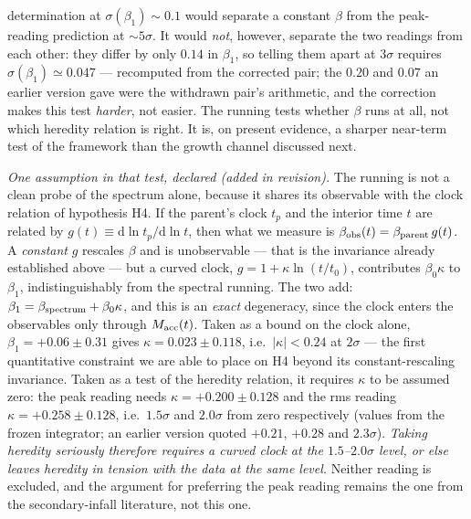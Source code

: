 \documentclass[11pt]{article}
\begin{document}
determination at $\sigma(\beta_1) \sim 0.1$ would separate a constant $\beta$ from the
peak-reading prediction at $\sim 5\sigma$. It would \emph{not}, however, separate the two readings
from each other: they differ by only $0.14$ in $\beta_1$, so telling them apart at $3\sigma$
requires $\sigma(\beta_1) \simeq 0.047$ --- recomputed from the corrected pair; the $0.20$ and $0.07$ an earlier version gave were the withdrawn pair's arithmetic, and the correction makes this test \emph{harder}, not easier. The running tests whether $\beta$ runs at all, not which
heredity relation is right. It is, on present evidence, a sharper near-term test of
the framework than the growth channel discussed next.

\emph{One assumption in that test, declared (added in revision).} The running is not a clean
probe of the spectrum alone, because it shares its observable with the clock relation of
hypothesis H4. If the parent's clock $t_p$ and the interior time $t$ are related by
$g(t) \equiv \mathrm{d}\ln t_p/\mathrm{d}\ln t$, then what we measure is
$\beta_{\rm obs}(t) = \beta_{\rm parent}\,g(t)$. A \emph{constant} $g$ rescales $\beta$ and is
unobservable --- that is the invariance already established above --- but a curved clock,
$g = 1 + \kappa\ln(t/t_0)$, contributes $\beta_0\kappa$ to $\beta_1$, indistinguishably from the
spectral running. The two add: $\beta_1 = \beta_{\rm spectrum} + \beta_0\kappa$, and this is an
\emph{exact} degeneracy, since the clock enters the observables only through $M_{\rm acc}(t)$.
Taken as a bound on the clock alone, $\beta_1 = +0.06 \pm 0.31$ gives
$\kappa = 0.023 \pm 0.118$, i.e.\ $|\kappa| < 0.24$ at $2\sigma$ --- the first quantitative
constraint we are able to place on H4 beyond its constant-rescaling invariance. Taken as a test of
the heredity relation, it requires $\kappa$ to be assumed zero: the peak reading needs
$\kappa = +0.200 \pm 0.128$ and the rms reading $\kappa = +0.258 \pm 0.128$, i.e.\ $1.5\sigma$ and
$2.0\sigma$ from zero respectively (values from the frozen integrator; an earlier version quoted $+0.21$, $+0.28$ and $2.3\sigma$). \emph{Taking heredity seriously therefore requires a curved
clock at the $1.5$--$2.0\sigma$ level, or else leaves heredity in tension with the data at the
same level.} Neither reading is excluded, and the argument for preferring the peak reading remains
the one from the secondary-infall literature, not this one.
\end{document}
